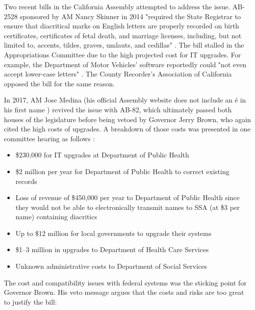 Two recent bills in the California Assembly attempted to address the issue.
AB-2528 sponsored by AM Nancy Skinner in 2014 "required the State Registrar to
ensure that diacritical marks on English letters are properly recorded on birth
certificates, certificates of fetal death, and marriage licenses, including,
but not limited to, accents, tildes, graves, umlauts, and cedillas"
\parencite{ab2528}. The bill stalled in the Appropriations Committee due to the
high projected cost for IT upgrades. For example, the Department of Motor
Vehicles' software reportedly could "not even accept lower-case letters"
\parencite{ab2528}. The County Recorder's Association of California opposed the
bill for the same reason.

In 2017, AM Jose Medina (his official Assembly website does not include an é in
his first name \parencite{medina}) revived the issue with AB-82, which
ultimately passed both houses of the legislature before being vetoed by
Governor Jerry Brown, who again cited the high costs of upgrades. A breakdown
of those costs was presented in one committee hearing as follows
\parencite{veto}:

\begin{itemize}

\item \$230,000 for IT upgrades at Department of Public Health

\item \$2 million per year for Department of Public Health to correct existing
records

\item Loss of revenue of \$450,000 per year to Department of Public Health
since they would not be able to electronically transmit names to SSA (at \$3
per name) containing diacritics

\item Up to \$12 million for local governments to upgrade their systems

\item \$1--3 million in upgrades to Department of Health Care Services

\item Unknown administrative costs to Department of Social Services

\end{itemize}

The cost and compatibility issues with federal systems was the sticking point
for Governor Brown. His veto message argues that the costs and risks are too
great to justify the bill:

